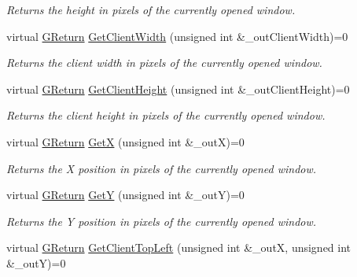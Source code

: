 \begin{DoxyCompactItemize}
\begin{DoxyCompactList}\small\item\em Returns the height in pixels of the currently opened window. \end{DoxyCompactList}\item 
virtual \mbox{\hyperlink{namespace_g_w_a67a839e3df7ea8a5c5686613a7a3de21}{G\+Return}} \mbox{\hyperlink{class_g_w_1_1_s_y_s_t_e_m_1_1_g_window_a6cedaf7ca08ed3519092196a8ae79784}{Get\+Client\+Width}} (unsigned int \&\+\_\+out\+Client\+Width)=0
\begin{DoxyCompactList}\small\item\em Returns the client width in pixels of the currently opened window. \end{DoxyCompactList}\item 
virtual \mbox{\hyperlink{namespace_g_w_a67a839e3df7ea8a5c5686613a7a3de21}{G\+Return}} \mbox{\hyperlink{class_g_w_1_1_s_y_s_t_e_m_1_1_g_window_aca175a29d6e87e4d4ed848325216c8f1}{Get\+Client\+Height}} (unsigned int \&\+\_\+out\+Client\+Height)=0
\begin{DoxyCompactList}\small\item\em Returns the client height in pixels of the currently opened window. \end{DoxyCompactList}\item 
virtual \mbox{\hyperlink{namespace_g_w_a67a839e3df7ea8a5c5686613a7a3de21}{G\+Return}} \mbox{\hyperlink{class_g_w_1_1_s_y_s_t_e_m_1_1_g_window_a61da1f01be5fa48df2375701ed0062e9}{GetX}} (unsigned int \&\+\_\+outX)=0
\begin{DoxyCompactList}\small\item\em Returns the X position in pixels of the currently opened window. \end{DoxyCompactList}\item 
virtual \mbox{\hyperlink{namespace_g_w_a67a839e3df7ea8a5c5686613a7a3de21}{G\+Return}} \mbox{\hyperlink{class_g_w_1_1_s_y_s_t_e_m_1_1_g_window_a58d456c963afd1b4d9235a1336d57754}{GetY}} (unsigned int \&\+\_\+outY)=0
\begin{DoxyCompactList}\small\item\em Returns the Y position in pixels of the currently opened window. \end{DoxyCompactList}\item 
virtual \mbox{\hyperlink{namespace_g_w_a67a839e3df7ea8a5c5686613a7a3de21}{G\+Return}} \mbox{\hyperlink{class_g_w_1_1_s_y_s_t_e_m_1_1_g_window_ac80bfaba809d5eb54d6a11b11deddeb7}{Get\+Client\+Top\+Left}} (unsigned int \&\+\_\+outX, unsigned int \&\+\_\+outY)=0

\end{DoxyCompactItemize}
